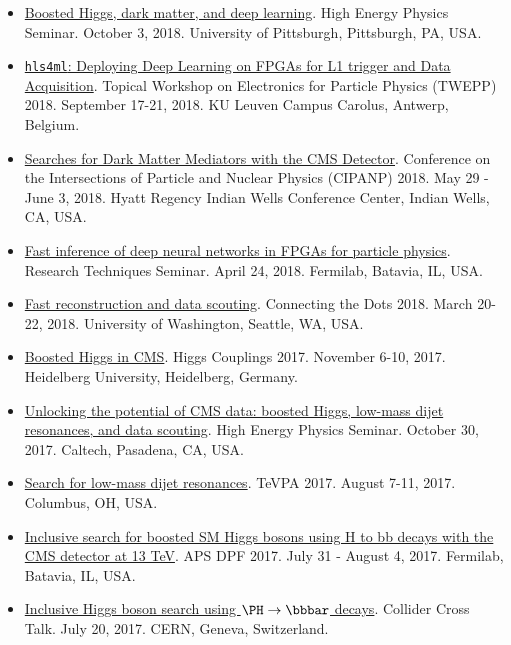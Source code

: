 \documentclass[11pt]{res}
\begin{document}
\begin{resume}
\begin{itemize}
    \item \href{https://www.physicsandastronomy.pitt.edu/events/hep-seminar-javier-duarte-fermilab}{Boosted Higgs, dark matter, and deep learning}. High Energy Physics Seminar. October 3, 2018. University of Pittsburgh, Pittsburgh, PA, USA.
    \item \href{https://indico.cern.ch/event/697988/contributions/3055990/}{\texttt{hls4ml}: Deploying Deep Learning on FPGAs for L1 trigger and Data Acquisition}. Topical Workshop on Electronics for Particle Physics (TWEPP) 2018. September 17-21, 2018. KU Leuven Campus Carolus, Antwerp, Belgium.
    \item \href{https://conferences.lbl.gov/event/137/session/27/contribution/354}{Searches for Dark Matter Mediators with the CMS Detector}. Conference on the Intersections of Particle and Nuclear Physics (CIPANP) 2018. May 29 - June 3, 2018. Hyatt Regency Indian Wells Conference Center, Indian Wells, CA, USA.
    \item \href{https://indico.fnal.gov/event/16908/}{Fast inference of deep neural networks in FPGAs for particle physics}. Research Techniques Seminar. April 24, 2018. Fermilab, Batavia, IL, USA.
    \item \href{https://indico.cern.ch/event/658267/contributions/2881127/}{Fast reconstruction and data scouting}. Connecting the Dots 2018. March 20-22, 2018. University of Washington, Seattle, WA, USA.
    \item \href{http://www.thphys.uni-heidelberg.de/~higgs/talks/duarte.pdf}{Boosted Higgs in CMS}. Higgs Couplings 2017. November 6-10, 2017. Heidelberg University, Heidelberg, Germany.
    \item \href{https://indico.hep.caltech.edu/indico/conferenceDisplay.py?confId=149}{Unlocking the potential of CMS data: boosted Higgs, low-mass dijet resonances, and data scouting}. High Energy Physics Seminar. October 30, 2017. Caltech, Pasadena, CA, USA.
    \item \href{https://indico.cern.ch/event/615891/contributions/2666361/}{Search for low-mass dijet resonances}. TeVPA 2017. August 7-11, 2017. Columbus, OH, USA.
    \item \href{https://indico.fnal.gov/contributionDisplay.py?sessionId=14&contribId=38&confId=11999}{Inclusive search for boosted SM Higgs bosons using H to bb decays with the CMS detector at 13 TeV}. APS DPF 2017. July 31 - August 4, 2017. Fermilab, Batavia, IL, USA.
    \item \href{https://indico.cern.ch/event/649575/}{Inclusive Higgs boson search using $\PH\to\bbbar$ decays}. Collider Cross Talk. July 20, 2017. CERN, Geneva, Switzerland.

\end{itemize}
\end{resume}
\end{document}
